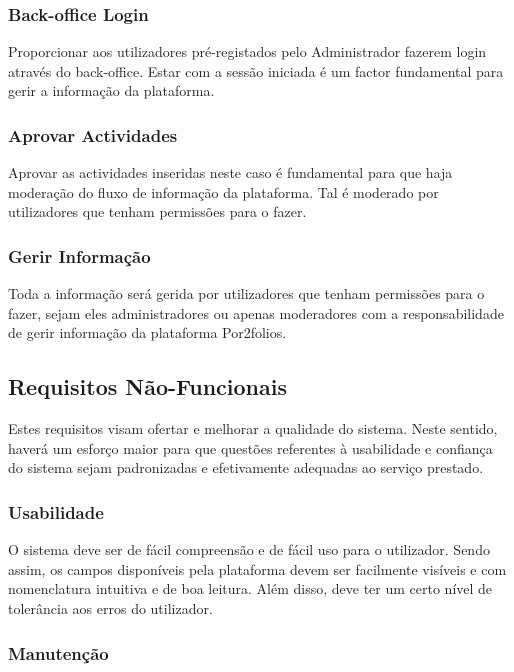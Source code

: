 \documentclass[a4paper,12pt,journal,twoside,compsoc]{PPIEEEtran}
\begin{document}
\subsubsection{Back-office Login}

Proporcionar aos utilizadores pré-registados pelo Administrador fazerem login através do back-office. Estar com a sessão iniciada é um factor fundamental para gerir a informação da plataforma.

\subsubsection{Aprovar Actividades}

Aprovar as actividades inseridas neste caso é fundamental para que haja moderação do fluxo de informação da plataforma. Tal é moderado por utilizadores que tenham permissões para o fazer.

\subsubsection{Gerir Informação}

Toda a informação será gerida por utilizadores que tenham permissões para o fazer, sejam eles administradores ou apenas moderadores com a responsabilidade de gerir informação da plataforma Por2folios.

\subsection{Requisitos Não-Funcionais}

Estes requisitos visam ofertar e melhorar a qualidade do sistema. Neste sentido, haverá um esforço maior para que questões referentes à usabilidade e confiança do sistema sejam padronizadas e efetivamente adequadas ao serviço prestado.

\subsubsection{Usabilidade}

O sistema deve ser de fácil compreensão e de fácil uso para o utilizador. Sendo assim, os campos disponíveis pela plataforma devem ser facilmente visíveis e com nomenclatura intuitiva e de boa leitura. Além disso, deve ter um certo nível de tolerância aos erros do utilizador.

\subsubsection{Manutenção}
\end{document}
